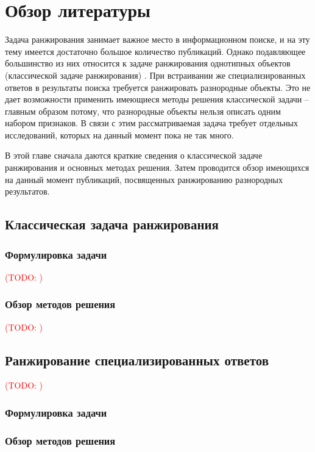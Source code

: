 \documentclass[12pt,a4paper]{report}
\newcommand\note[1]{\textcolor{red}{(#1)}}
\newcommand\todonote[1]{\note{TODO: #1}}
\begin{document}
\chapter{Обзор литературы}

Задача ранжирования занимает важное место в информационном поиске, и на эту тему имеется достаточно большое количество публикаций. Однако подавляющее большинство из них относится к задаче ранжирования однотипных объектов (классической задаче ранжирования) \cite{Liu-LR}. При встраивании же специализированных ответов в результаты поиска требуется ранжировать разнородные объекты. Это не дает возможности применить имеющиеся методы решения классической задачи -- главным образом потому, что разнородные объекты нельзя описать одним набором признаков. В связи с этим рассматриваемая задача требует отдельных исследований, которых на данный момент пока не так много.

В этой главе сначала даются краткие сведения о классической задаче ранжирования и основных методах решения. Затем проводится обзор имеющихся на данный момент публикаций, посвященных ранжированию разнородных результатов.

\section{Классическая задача ранжирования}
\subsection{Формулировка задачи}

\todonote{}

\subsection{Обзор методов решения}

\todonote{}

\section{Ранжирование специализированных ответов}

\todonote{}

\subsection{Формулировка задачи}

\subsection{Обзор методов решения}
\end{document}
